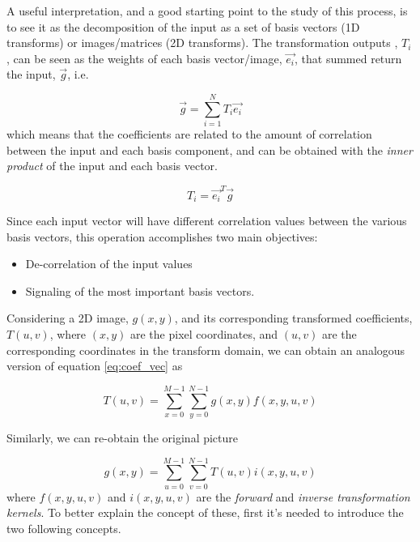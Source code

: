 A useful interpretation, and a good starting point to the study of this process, is to see it as the decomposition of the input as a set of basis vectors (1D transforms) or images/matrices (2D transforms). The transformation outputs , $T_i$, can be seen as the weights of each basis vector/image, $\vec{e_i}$, that summed return the input, $\vec{g}$, i.e.

\begin{equation}
    \vec{g} = \sum_{i=1}^{N} T_i \vec{e_i}
\end{equation}
which means that the coefficients are related to the amount of correlation between the input and each basis component, and can be obtained with the \emph{inner product} of the input and each basis vector.

\begin{equation} \label{eq:coef_vec}
    T_i = \vec{e_i}^T \vec{g}
\end{equation}

Since each input vector will have different correlation values between the various basis vectors, this operation accomplishes two main objectives:

\begin{itemize}
    \item De-correlation of the input values
    \item Signaling of the most important basis vectors.
\end{itemize}

Considering a 2D image, $g(x,y)$, and its corresponding transformed coefficients, $T(u,v)$, where $(x,y)$ are the pixel coordinates, and $(u,v)$ are the corresponding coordinates in the transform domain, we can obtain an analogous version of equation \ref{eq:coef_vec} as

\begin{equation} \label{eq:Tmatsum}
    T(u,v) = \sum_{x=0}^{M-1}\sum_{y=0}^{N-1}g(x,y)f(x,y,u,v)
\end{equation}

Similarly, we can re-obtain the original picture

\begin{equation} \label{eq:Gmatsum}
    g(x,y) = \sum_{u=0}^{M-1}\sum_{v=0}^{N-1}T(u,v)i(x,y,u,v)
\end{equation}
where $f(x,y,u,v)$ and $i(x,y,u,v)$ are the \emph{forward} and \emph{inverse transformation kernels}. To better explain the concept of these, first it's needed to introduce the two following concepts.


